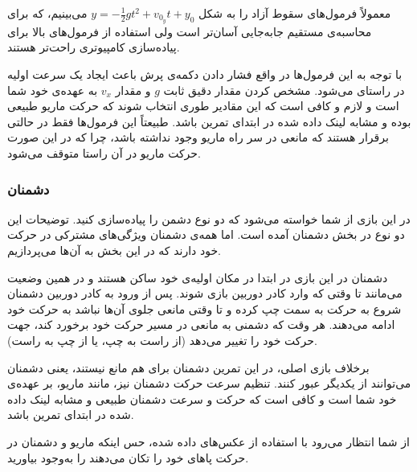 \documentclass{utap}
\begin{document}
معمولاً فرمول‌های سقوط آزاد را به شکل
$y = -\frac{1}{2}gt^2 + v_{0_y} t + y_0$
می‌بینیم، که برای محاسبه‌ی مستقیم جابه‌جایی آسان‌تر است ولی استفاده از فرمول‌های بالا برای پیاده‌سازی کامپیوتری راحت‌تر هستند.

با توجه به این فرمول‌ها در واقع فشار دادن دکمه‌ی پرش باعث ایجاد یک سرعت اولیه در راستای‌  می‌شود. مشخص کردن مقدار دقیق ثابت $g$ و مقدار $v_x$ به عهده‌ی خود شما است و لازم و کافی است که این مقادیر طوری انتخاب شوند که حرکت ماریو طبیعی بوده و مشابه لینک داده شده در ابتدای تمرین باشد. طبیعتاً این فرمول‌ها فقط در حالتی برقرار هستند که مانعی در سر راه ماریو وجود نداشته باشد، چرا که در این صورت حرکت ماریو در آن راستا متوقف می‌شود.
		\subsubsection{دشمنان}
در این بازی از شما خواسته می‌شود که دو نوع دشمن را پیاده‌سازی کنید. توضیحات این دو نوع در بخش دشمنان آمده است. اما همه‌ی دشمنان ویژگی‌های مشترکی در حرکت خود دارند که در این بخش به آن‌ها می‌پردازیم.

دشمنان در این بازی در ابتدا در مکان اولیه‌ی خود ساکن هستند و در همین وضعیت می‌مانند تا وقتی که وارد کادر دوربین بازی شوند. پس از ورود به کادر دوربین دشمنان شروع به حرکت به سمت چپ کرده و تا وقتی مانعی جلو‌ی آن‌ها نباشد به حرکت خود ادامه می‌دهند. هر وقت که دشمنی به مانعی در مسیر حرکت خود برخورد کند، جهت حرکت خود را تغییر می‌دهد (از راست به چپ، یا از چپ به راست).

برخلاف بازی اصلی، در این تمرین دشمنان برای هم مانع نیستند، یعنی دشمنان می‌توانند از یکدیگر عبور کنند. تنظیم سرعت حرکت دشمنان نیز، مانند ماریو، بر عهده‌ی خود شما است و کافی است که حرکت و سرعت دشمنان طبیعی و مشابه لینک داده شده در ابتدای تمرین باشد.

از شما انتظار می‌رود با استفاده از عکس‌های داده شده، حس اینکه ماریو و دشمنان در حرکت پاهای خود را تکان می‌دهند را به‌وجود بیاورید.
\end{document}
